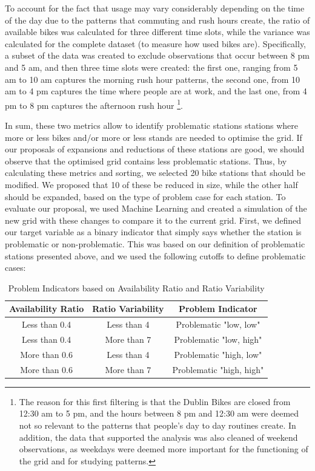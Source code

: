 \noindent To account for the fact that usage may vary considerably depending on the time of the day due to the patterns that commuting and rush hours create, the ratio of available bikes was calculated for three different time slots, while the variance was calculated for the complete dataset (to measure how used bikes are). Specifically, a subset of the data was created to exclude observations that occur between 8 pm and 5 am, and then three time slots were created: the first one, ranging from 5 am to 10 am captures the morning rush hour patterns, the second one, from 10 am to 4 pm captures the time where people are at work, and the last one, from 4 pm to 8 pm captures the afternoon rush hour \footnote{The reason for this first filtering is that the Dublin Bikes are closed from 12:30 am to 5 pm, and the hours between 8 pm and 12:30 am were deemed not so relevant to the patterns that people's day to day routines create. In addition, the data that supported the analysis was also cleaned of weekend observations, as weekdays were deemed more important for the functioning of the grid and for studying patterns.}. 

\vspace{0.3cm}
\noindent In sum, these two metrics allow to identify problematic stations \textemdash stations where more or less bikes and/or more or less stands are needed to optimise the grid\textemdash. If our proposals of expansions and reductions of these stations are good, we should observe that the optimised grid contains less problematic stations. Thus, by calculating these metrics and sorting, we selected 20 bike stations that should be modified. We proposed that 10 of these be reduced in size, while the other half should be expanded, based on the type of problem case for each station. To evaluate our proposal, we used Machine Learning and created a simulation of the new grid with these changes to compare it to the current grid. First, we defined our target variable as a binary indicator that simply says whether the station is problematic or non-problematic. This was based on our definition of problematic stations presented above, and we used the following cutoffs to define problematic cases: 

\begin{table}[h]
    \centering
    \caption{Problem Indicators based on Availability Ratio and Ratio Variability}
    \begin{tabular}{|c|c|c|}
    \hline
    \textbf{Availability Ratio} & \textbf{Ratio Variability} & \textbf{Problem Indicator} \\
    \hline
    Less than 0.4 & Less than 4 & Problematic "low, low" \\
    Less than 0.4 & More than 7 & Problematic "low, high" \\
    More than 0.6 & Less than 4 & Problematic "high, low" \\
    More than 0.6 & More than 7 & Problematic "high, high" \\
    \hline
    \end{tabular}
    \label{tab:problem_indicators}
\end{table}

